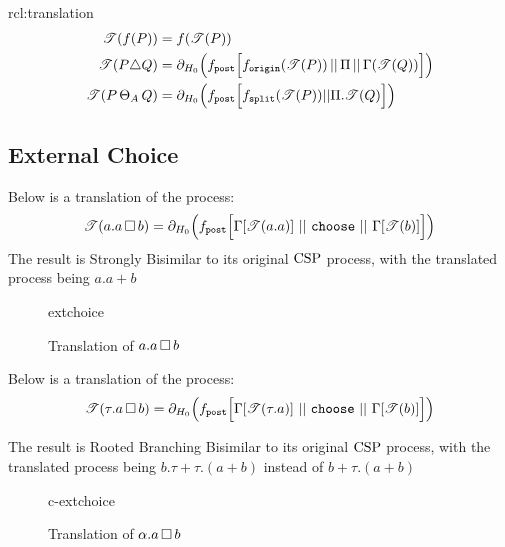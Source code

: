 \documentclass[../hons_project.tex]{subfiles}
\begin{document}
\begin{rcl}[Translation]{rcl:translation}{}
\begin{align*}
		\mathscr{T}(f(P))           & = f(\mathscr{T}(P))                                                                                                                                                                               \\
		\mathscr{T}(P \triangle Q) & = \partial_{H_{0}}\Bigl(f_{\mathtt{post}}\Bigl[ f_{\mathtt{origin}}(\mathscr{T}(P)) \,\vert\vert\, \Pi \,\vert\vert\, \Gamma(\mathscr{T}(Q)) \Bigr]\Bigr)                                                                          \\
		\mathscr{T}(P \,\Theta_{A}\, Q)     & = \partial_{H_{0}}\Bigl(f_{\mathtt{post}} \Bigl[ f_{\mathtt{split}}(\mathscr{T}(P)) | | \Pi.\mathscr{T}(Q) \Bigr]\Bigr)
	\end{align*}
\end{rcl}

\newpage
\subsection{External Choice}
Below is a translation of the process:
\[\mathscr{T}(a.a \,\square\, b) = \partial_{H_{0}}\Bigl(f_{\mathtt{post}}\Bigl[\Gamma[\mathscr{T}(a.a)]\, \,\vert\vert\, \,\mathtt{choose}\, \,\vert\vert\, \,\Gamma[\mathscr{T}(b)]\Bigl]\Bigr)\]
The result is Strongly Bisimilar to its original $\mathrm{CSP}$ process, with the translated process being $a.a + b$
\begin{figure}[H]
	\centering
	{extchoice}
	\caption{Translation of $a.a \,\square\, b$}
\end{figure}
Below is a translation of the process:
\[\mathscr{T}(\tau.a \,\square\, b) = \partial_{H_{0}}\Bigl(f_{\mathtt{post}}\Bigl[\Gamma[\mathscr{T}(\tau.a)]\, \,\vert\vert\, \,\mathtt{choose}\, \,\vert\vert\, \,\Gamma[\mathscr{T}(b)]\Bigl]\Bigr)\]

The result is Rooted Branching Bisimilar to its original $\mathrm{CSP}$ process, with the translated process being $b.\tau + \tau.(a + b)$ instead of $b + \tau.(a + b)$

\begin{figure}[H]
	{c-extchoice}
	\caption{Translation of $\alpha.a \,\square\, b$}
\end{figure}
\end{document}
